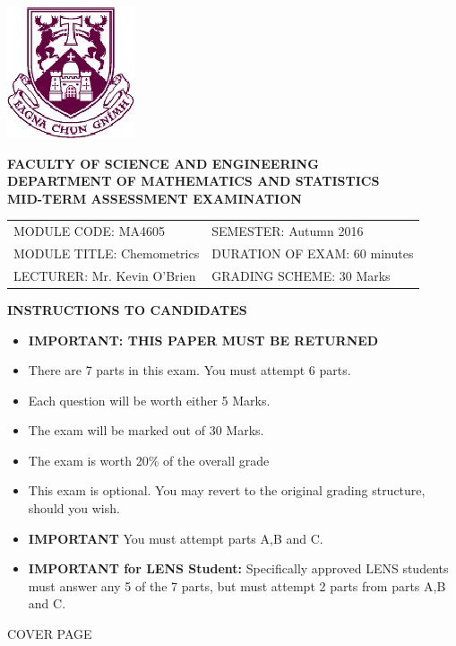 \documentclass[a4paper,12pt]{article}
\begin{document}
\begin{center}
	\includegraphics[scale=0.60]{images/shieldtransparent2}
\end{center}

\begin{center}
	\vspace{1cm}
	\large \bf {FACULTY OF SCIENCE AND ENGINEERING} \\[0.5cm]
	\normalsize DEPARTMENT OF MATHEMATICS AND STATISTICS \\[1.25cm]
	\large \bf {MID-TERM ASSESSMENT EXAMINATION } \\[1.0cm]
\end{center}

\begin{tabular}{ll}
	MODULE CODE: MA4605 & SEMESTER: Autumn 2016\\[1cm]
	MODULE TITLE: Chemometrics  & DURATION OF EXAM: 60 minutes \\[1cm]
	LECTURER: Mr. Kevin O'Brien & GRADING SCHEME: 30 Marks \\
\end{tabular}
\bigskip
\begin{center}
	{\bf INSTRUCTIONS TO CANDIDATES}
\end{center}
\medskip
\begin{itemize} 
\item \textbf{IMPORTANT: THIS PAPER MUST BE RETURNED}

	\item There are 7 parts in this exam. You must attempt 6 parts.
		\item Each question will be worth either 5 Marks.
		\item The exam will be marked out of 30 Marks.
		\item The exam is worth 20\% of the overall grade
\item This exam is optional. You may revert to the original grading structure, should you wish.
	\item \textbf{IMPORTANT} You must attempt parts A,B and C.\smallskip
	\item \textbf{IMPORTANT for LENS Student:}
	Specifically approved LENS students must answer any 5 of the 7 parts, but must attempt 2 parts from parts A,B and C.

\end{itemize}
\newpage
COVER PAGE
\newpage
\end{document}
